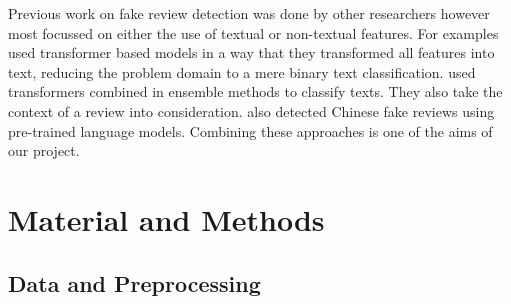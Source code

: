 \documentclass{article}
\begin{document}
Previous work on fake review detection was done by other researchers however most focussed on either the use of textual or non-textual features. For examples \cite{gu-budhkar} used transformer based models in a way that they transformed all features into text, reducing the problem domain to a mere binary text classification. \cite{mohawesh2021fake} used transformers combined in ensemble methods to classify texts. They also take the context of a review into consideration. \cite{weng2022detection} also detected Chinese fake reviews using pre-trained language models. Combining these approaches is one of the aims of our project.

\section{Material and Methods}
\label{sec:format}


\subsection{Data and Preprocessing}
\end{document}
